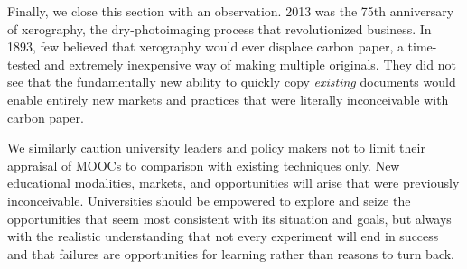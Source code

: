 Finally, we close this section with an observation.
2013 was the 75th anniversary of xerography, the dry-photoimaging
process that revolutionized business.
In 1893, few believed that xerography would ever displace carbon
paper, a time-tested and extremely inexpensive way of making multiple
originals.  They did not see that the fundamentally new ability to
quickly copy \emph{existing} documents would enable entirely new markets
and practices that were literally inconceivable with carbon paper.

We similarly caution university leaders and policy makers not to limit
their appraisal of MOOCs to comparison with existing techniques only.
New educational modalities, markets, and opportunities will arise that
were previously inconceivable.  Universities should be empowered to
explore and seize the opportunities that seem most consistent with its
situation and goals, but always with the realistic understanding that
not every experiment will end in success and that failures are
opportunities for learning rather than reasons to turn back.

